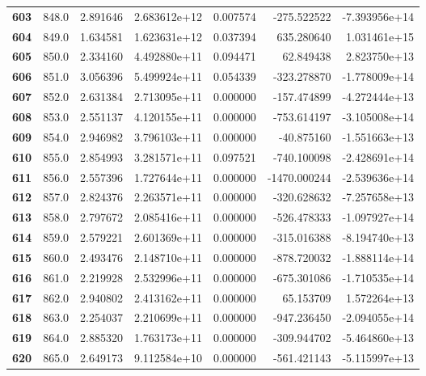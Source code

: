 \documentclass{report}[12pt]
\begin{document}
\begin{center}
\begin{tabular}{lrrrrrr}
\textbf{603 } &          848.0 &   2.891646 &  2.683612e+12 &    0.007574 &  -275.522522 & -7.393956e+14 \\
\textbf{604 } &          849.0 &   1.634581 &  1.623631e+12 &    0.037394 &   635.280640 &  1.031461e+15 \\
\textbf{605 } &          850.0 &   2.334160 &  4.492880e+11 &    0.094471 &    62.849438 &  2.823750e+13 \\
\textbf{606 } &          851.0 &   3.056396 &  5.499924e+11 &    0.054339 &  -323.278870 & -1.778009e+14 \\
\textbf{607 } &          852.0 &   2.631384 &  2.713095e+11 &    0.000000 &  -157.474899 & -4.272444e+13 \\
\textbf{608 } &          853.0 &   2.551137 &  4.120155e+11 &    0.000000 &  -753.614197 & -3.105008e+14 \\
\textbf{609 } &          854.0 &   2.946982 &  3.796103e+11 &    0.000000 &   -40.875160 & -1.551663e+13 \\
\textbf{610 } &          855.0 &   2.854993 &  3.281571e+11 &    0.097521 &  -740.100098 & -2.428691e+14 \\
\textbf{611 } &          856.0 &   2.557396 &  1.727644e+11 &    0.000000 & -1470.000244 & -2.539636e+14 \\
\textbf{612 } &          857.0 &   2.824376 &  2.263571e+11 &    0.000000 &  -320.628632 & -7.257658e+13 \\
\textbf{613 } &          858.0 &   2.797672 &  2.085416e+11 &    0.000000 &  -526.478333 & -1.097927e+14 \\
\textbf{614 } &          859.0 &   2.579221 &  2.601369e+11 &    0.000000 &  -315.016388 & -8.194740e+13 \\
\textbf{615 } &          860.0 &   2.493476 &  2.148710e+11 &    0.000000 &  -878.720032 & -1.888114e+14 \\
\textbf{616 } &          861.0 &   2.219928 &  2.532996e+11 &    0.000000 &  -675.301086 & -1.710535e+14 \\
\textbf{617 } &          862.0 &   2.940802 &  2.413162e+11 &    0.000000 &    65.153709 &  1.572264e+13 \\
\textbf{618 } &          863.0 &   2.254037 &  2.210699e+11 &    0.000000 &  -947.236450 & -2.094055e+14 \\
\textbf{619 } &          864.0 &   2.885320 &  1.763173e+11 &    0.000000 &  -309.944702 & -5.464860e+13 \\
\textbf{620 } &          865.0 &   2.649173 &  9.112584e+10 &    0.000000 &  -561.421143 & -5.115997e+13 \\

\end{tabular}
\end{center}
\end{document}
